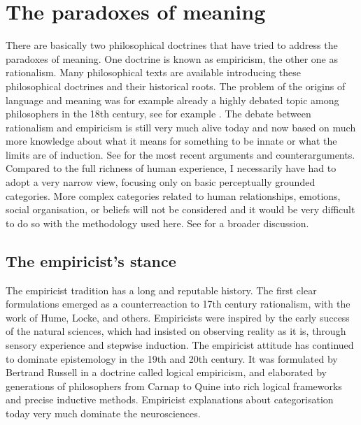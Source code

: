 \section{The paradoxes of meaning}

There are basically two philosophical doctrines that 
have tried to address the paradoxes of meaning. 
One doctrine is known as empiricism, the other one as 
rationalism.
Many philosophical texts are available introducing these
philosophical doctrines and their historical roots. 
The problem of the origins of language and meaning
was for example already a highly debated topic among philosophers in the 18th 
century, see for example \cite{Rousseau:1781}.
\newline \enlargethispage{1\baselineskip}
The debate between rationalism and empiricism
is still very much alive today and now based
on much more knowledge about what it means for 
something to be innate or what the limits are of
induction. See \cite{Elman:1998}
for the most recent arguments and counterarguments. Compared
to the full richness of human experience, I necessarily 
have had to adopt a very narrow view, focusing only on
basic perceptually grounded categories. More complex
categories related to human relationships, emotions, 
social organisation, or beliefs will not be 
considered and it would be very difficult to do so 
with the methodology used here. See \cite{Varela:1991}
for a broader discussion.
\subsection{The empiricist's stance}

The empiricist tradition has a long and reputable
history. The first clear formulations emerged as a 
counterreaction to 17th century rationalism, with the work of 
Hume, Locke, and others. Empiricists
were inspired by the early success 
of the natural sciences, which had insisted on observing reality
as it is, through sensory experience and stepwise induction. 
The empiricist attitude has continued to dominate epistemology
in the 19th and 20th century. It was formulated by Bertrand
Russell in a doctrine called logical empiricism, and 
elaborated by generations of philosophers from Carnap to Quine
into rich logical frameworks and precise inductive methods. 
Empiricist explanations about categorisation today very much
dominate the neurosciences. 

